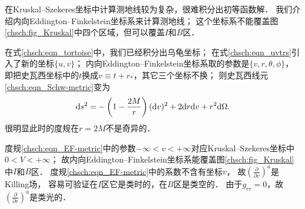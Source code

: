 在Kruskal--Szekeres坐标中计算测地线较为复杂，很难积分出初等函数解．
我们介绍内向Eddington--Finkelstein坐标系来计算测地线；
这个坐标系不能覆盖图\ref{chsch:fig_Kruskal}中四个区域，但可以覆盖$I$和$B$区．

在式\eqref{chsch:eqn_tortoise}中，我们已经积分出乌龟坐标；
在式\eqref{chsch:eqn_uvtrs}引入了新的坐标$\{u,v\}$；
内向Eddington--Finkelstein坐标系取的参数是$\{v,r,\theta,\phi\}$，
即把史瓦西坐标中的$t$换成$v\equiv t+r_*$，其它三个坐标不换；
则史瓦西线元\eqref{chsch:eqn_Schw-metric}变为
\begin{equation}\label{chsch:eqn_EF-metric}
    {\rm d}s^2 = - \left(1-\frac{2 M}{r}\right) ({\rm d}v)^2
    + 2 {\rm d}r {\rm d}v + r^2 {\rm d}\Omega.
\end{equation}
很明显此时的度规在$r=2M$不是奇异的．


度规\eqref{chsch:eqn_EF-metric}中的参数$-\infty<v<+\infty$对应Kruskal--Szekeres坐标中$0<V<+\infty$；
故内向Eddington--Finkelstein坐标系能覆盖图\ref{chsch:fig_Kruskal}中$I$和$B$区．
度规\eqref{chsch:eqn_EF-metric}中的系数不含有坐标$v$，
故$(\frac{\partial}{\partial v})^a$是Killing场，
容易可验证在$I$区它是类时的，在$B$区是类空的．
由于$g_{rr}=0$，故$(\frac{\partial}{\partial r})^a$是类光的．


